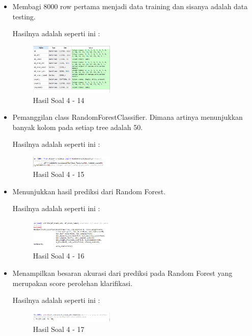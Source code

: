 \begin{enumerate}
\begin{itemize}
	\item Membagi 8000 row pertama menjadi data training dan sisanya adalah data testing.
	
	Hasilnya adalah seperti ini :

	\begin{figure}[H]
	\centering
		\includegraphics[width=4cm]{figures/1174096/tugas3/hasil414.PNG}
		\caption{Hasil Soal 4 - 14}
	\end{figure}

	\item Pemanggilan class RandomForestClassifier. Dimana artinya menunjukkan banyak kolom pada setiap tree adalah 50.
	
	Hasilnya adalah seperti ini :

	\begin{figure}[H]
	\centering
		\includegraphics[width=4cm]{figures/1174096/tugas3/hasil415.PNG}
		\caption{Hasil Soal 4 - 15}
	\end{figure}

	\item Menunjukkan hasil prediksi dari Random Forest.
	
	Hasilnya adalah seperti ini :

	\begin{figure}[H]
	\centering
		\includegraphics[width=4cm]{figures/1174096/tugas3/hasil416.PNG}
		\caption{Hasil Soal 4 - 16}
	\end{figure}

	\item Menampilkan besaran akurasi dari prediksi pada Random Forest yang merupakan score perolehan klarifikasi.
	
	Hasilnya adalah seperti ini :

	\begin{figure}[H]
	\centering
		\includegraphics[width=4cm]{figures/1174096/tugas3/hasil417.PNG}
		\caption{Hasil Soal 4 - 17}
	\end{figure}


\end{itemize}
\end{enumerate}
